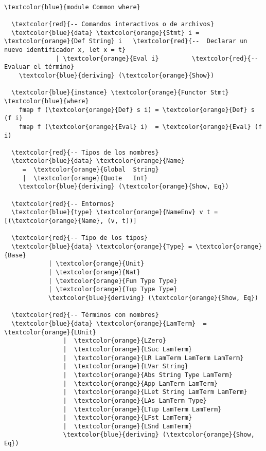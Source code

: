 \documentclass[12pt, a4paper]{article}
\begin{document}
\begin{Verbatim}[commandchars=\\\{\}]

\textcolor{blue}{module Common where}

  \textcolor{red}{-- Comandos interactivos o de archivos}
  \textcolor{blue}{data} \textcolor{orange}{Stmt} i = \textcolor{orange}{Def String} i   \textcolor{red}{--  Declarar un nuevo identificador x, let x = t}
              | \textcolor{orange}{Eval i}         \textcolor{red}{--  Evaluar el término}
    \textcolor{blue}{deriving} (\textcolor{orange}{Show})
  
  \textcolor{blue}{instance} \textcolor{orange}{Functor Stmt} \textcolor{blue}{where}
    fmap f (\textcolor{orange}{Def} s i) = \textcolor{orange}{Def} s (f i)
    fmap f (\textcolor{orange}{Eval} i)  = \textcolor{orange}{Eval} (f i)

  \textcolor{red}{-- Tipos de los nombres}
  \textcolor{blue}{data} \textcolor{orange}{Name}
     =  \textcolor{orange}{Global  String}
     |  \textcolor{orange}{Quote   Int}
    \textcolor{blue}{deriving} (\textcolor{orange}{Show, Eq})

  \textcolor{red}{-- Entornos}
  \textcolor{blue}{type} \textcolor{orange}{NameEnv} v t = [(\textcolor{orange}{Name}, (v, t))]

  \textcolor{red}{-- Tipo de los tipos}
  \textcolor{blue}{data} \textcolor{orange}{Type} = \textcolor{orange}{Base}
            | \textcolor{orange}{Unit}
            | \textcolor{orange}{Nat}
            | \textcolor{orange}{Fun Type Type}
            | \textcolor{orange}{Tup Type Type}
            \textcolor{blue}{deriving} (\textcolor{orange}{Show, Eq})
  
  \textcolor{red}{-- Términos con nombres}
  \textcolor{blue}{data} \textcolor{orange}{LamTerm}  =  \textcolor{orange}{LUnit}
                |  \textcolor{orange}{LZero}
                |  \textcolor{orange}{LSuc LamTerm}
                |  \textcolor{orange}{LR LamTerm LamTerm LamTerm}
                |  \textcolor{orange}{LVar String}
                |  \textcolor{orange}{Abs String Type LamTerm}
                |  \textcolor{orange}{App LamTerm LamTerm}
                |  \textcolor{orange}{LLet String LamTerm LamTerm}
                |  \textcolor{orange}{LAs LamTerm Type}
                |  \textcolor{orange}{LTup LamTerm LamTerm}
                |  \textcolor{orange}{LFst LamTerm}
                |  \textcolor{orange}{LSnd LamTerm}
                \textcolor{blue}{deriving} (\textcolor{orange}{Show, Eq})



\end{Verbatim}
\end{document}
